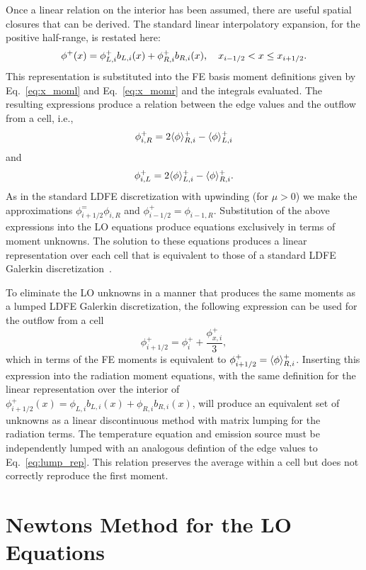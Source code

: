 Once a linear relation on the interior has been assumed, there are useful spatial closures that can be
derived.  The standard linear interpolatory expansion, for the positive half-range, is restated here:
\begin{equation}
\phi^+(x) = \phi^+_{L,i} b_{L,i}(x) + \phi^+_{R,i} b_{R,i}(x), \quad {x_{i-1/2}} < x \leq {x_{i+1/2}}.
\end{equation}
This representation is substituted into the FE basis moment definitions given by
Eq.~\eqref{eq:x_moml} and Eq.~\eqref{eq:x_momr} and the integrals evaluated.  The
resulting expressions produce a relation between the edge values and the outflow from a
cell, i.e., 
\begin{equation}
    \phi_{i,R}^+ = 2 \langle \phi \rangle_{R,i}^+ - \langle \phi \rangle_{L,i}^+
\end{equation}
and
\begin{equation}
    \phi_{i,L}^+ = 2 \langle \phi \rangle_{L,i}^+ - \langle \phi \rangle_{R,i}^+.
\end{equation}
As in the standard LDFE discretization with upwinding (for $\mu>0$) we make the
approximations $\phi_{i+1/2}^=\phi_{i,R}$ and $\phi_{i-1/2}^+=\phi_{i-1,R}$. Substitution
of the above expressions into the LO equations produce
equations exclusively in terms of moment unknowns.  The solution to these equations produces a linear
representation over each cell that is equivalent to those of a standard LDFE Galerkin
discretization~\cite{fem_book}.

To eliminate the LO unknowns in a manner that produces the same moments as a lumped LDFE
Galerkin discretization, the
following expression can be used for the outflow from a cell
\begin{equation}\label{eq:lump_rep}
    \phi_{i+1/2}^+ = \phi_i^+ + \frac{\phi_{x,i}^+}{3},
\end{equation}
which in terms of the FE moments is equivalent to $\phi_{i+1/2}^+ =
\langle \phi \rangle_{R,i}^+$.  Inserting this expression into the radiation moment equations, with the same
definition for the linear representation over the interior of $\phi_{i+1/2}^+(x) =
\phi_{L,i} b_{L,i}(x) + \phi_{R,i} b_{R,i}(x)$, will produce an equivalent set of unknowns
as a linear discontinuous method with matrix lumping for the radiation terms.  The
temperature equation and emission source must be independently lumped with an analogous
defintion of the edge values to Eq.~\eqref{eq:lump_rep}. This
relation preserves the average within a cell but does not correctly reproduce the first moment.  

\section{Newtons Method for the LO Equations}
\label{app:lo_newton}

